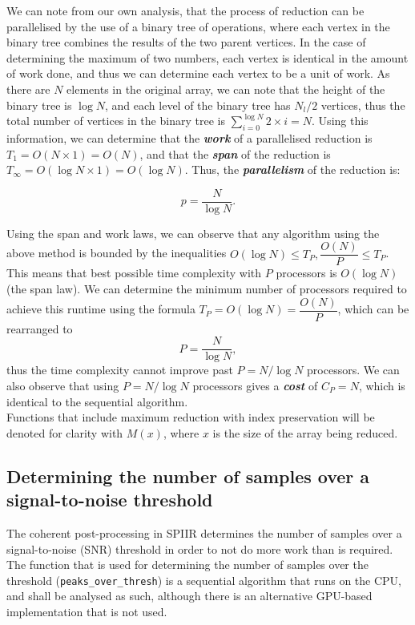 \documentclass{article}
\begin{document}
We can note from our own analysis, that the process of reduction can be parallelised by the use of a binary tree of operations, where each vertex in the binary tree combines the results of the two parent vertices.
In the case of determining the maximum of two numbers, each vertex is identical in the amount of work done, and thus we can determine each vertex to be a unit of work.
As there are \(N\) elements in the original array, we can note that the height of the binary tree is \(\log N\), and each level of the binary tree has \(N_l/2\) vertices, thus the total number of vertices in the binary tree is \(\sum_{i=0}^{\log N}{2\times{i}} = N\).
Using this information, we can determine that the \textit{\textbf{work}} of a parallelised reduction is \(T_1 = O(N\times1) = O(N)\), and that the \textit{\textbf{span}} of the reduction is \(T_\infty = O(\log N \times {1}) = O(\log N)\).
Thus, the \textit{\textbf{parallelism}} of the reduction is:

\[
    p = \dfrac{N}{\log N}.
\]

Using the span and work laws, we can observe that any algorithm using the above method is bounded by the inequalities \(O(\log N) \leq T_P, \dfrac{O(N)}{P} \leq T_P\).
This means that best possible time complexity with \(P\) processors is \(O(\log N)\) (the span law).
We can determine the minimum number of processors required to achieve this runtime using the formula \(T_P = O(\log N) = \dfrac{O(N)}{P}\), which can be rearranged to
\[
    P = \dfrac{N}{\log N},
\]
thus the time complexity cannot improve past \(P = N/\log N\) processors.
We can also observe that using \(P = N/\log N\) processors gives a \textit{\textbf{cost}} of \(C_P = N\), which is identical to the sequential algorithm.
\\

Functions that include maximum reduction with index preservation will be denoted for clarity with \(M(x)\), where \(x\) is the size of the array being reduced.

\subsection{Determining the number of samples over a signal-to-noise threshold} \label{sec:peaks}

The coherent post-processing in SPIIR determines the number of samples over a signal-to-noise (SNR) threshold in order to not do more work than is required.
The function that is used for determining the number of samples over the threshold (\texttt{peaks\_over\_thresh}) is a sequential algorithm that runs on the CPU, and shall be analysed as such, although there is an alternative GPU-based implementation that is not used.
\end{document}
